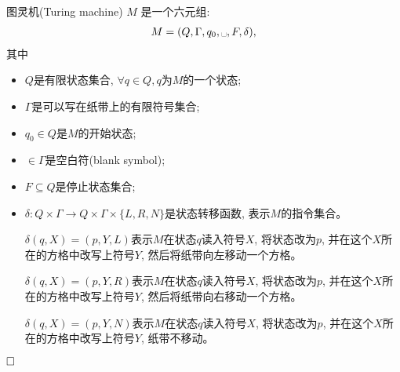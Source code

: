 \begin{definition}

图灵机(Turing machine) $M$ 是一个六元组:
\begin{align}
M=(Q,\Gamma,q_0,\text{\textvisiblespace},F,\delta), 
\end{align}
其中
\begin{itemize}
	\item $Q$是有限状态集合, $\forall q\in Q, q$为$M$的一个状态;
	\item $\Gamma$是可以写在纸带上的有限符号集合;
	\item $q_0\in Q$是$M$的开始状态;
	\item \textvisiblespace$\in\Gamma$是空白符(blank symbol);
	\item $F\subseteq Q$是停止状态集合;  
	\item $\delta:Q\times\Gamma\to Q\times\Gamma\times\{L,R,N\}$是状态转移函数, 表示$M$的指令集合。
	
	$\delta(q,X)=(p,Y,L)$表示$M$在状态$q$读入符号$X$, 将状态改为$p$, 并在这个$X$所在的方格中改写上符号$Y$, 然后将纸带向左移动一个方格。
	
	$\delta(q,X)=(p,Y,R)$表示$M$在状态$q$读入符号$X$, 将状态改为$p$, 并在这个$X$所在的方格中改写上符号$Y$, 然后将纸带向右移动一个方格。
	
	$\delta(q,X)=(p,Y,N)$表示$M$在状态$q$读入符号$X$, 将状态改为$p$, 并在这个$X$所在的方格中改写上符号$Y$, 纸带不移动。
\end{itemize}
$\hfill\square$
\end{definition}

